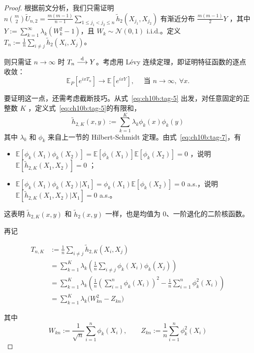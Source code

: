 \begin{proof}

根据前文分析，我们只需证明 $n\binom m2\widetilde U_{n,2}=\frac{m(m-1)}{n-1}\sum_{1\le j_1<j_2\le n}\widetilde h_2(X_{j_1},X_{j_2})$ 有渐近分布 $\tfrac{m(m-1)}{2}Y$ ，其中 $Y:=\sum_{k=1}^\infty\lambda_k(W_k^2-1)$，且 $W_k\sim \mathcal N(0,1)$ i.i.d.。定义 $T_n:=\frac1n\sum_{i\ne j}\widetilde h_2(X_i,X_j)$。

则只需证 $n\to\infty$ 时 $T_n\overset{\rm d}\longrightarrow Y$。考虑用 Lévy 连续定理，即证明特征函数的逐点收敛：
\[
\mathbb E_P[e^{ixT_n}]\to\mathbb E[e^{ixY}],\quad \text{ 当 }n\to\infty,\ \forall x.
\]

要证明这一点，还需考虑截断技巧。从式~\eqref{eq:ch10b:tag-5} 出发，对任意固定的正整数 $K$ ，定义式~\eqref{eq:ch10b:tag-5}的有限和，
\[\widetilde{h}_{2,K}(x,y) := \sum_{k=1}^{K} \lambda_k \phi_k(x) \phi_k(y)\]
其中 $\lambda_k$ 和 $\phi_k$ 来自上一节的 Hilbert-Schmidt 定理。由式~\eqref{eq:ch10b:tag-7}，有

\begin{itemize}
\tightlist
\item
  $\mathbb{E}[\phi_k(X_1)\phi_k(X_2)] = \mathbb{E}[\phi_k(X_1)]\mathbb{E}[\phi_k(X_2)] = 0$ ，说明 $\mathbb E[\widetilde h_{2,K}(X_1,X_2)]=0$ ；
\item
  $\mathbb{E}[\phi_k(X_1)\phi_k(X_2)|X_1] = \phi_k(X_1) \mathbb{E}[\phi_k(X_2)] = 0$ a.s.，说明 $\mathbb E[\widetilde h_{2,K}(X_1,X_2)|X_1]=0$ a.s.。
\end{itemize}

这表明 $\widetilde h_{2,K}(x,y)$ 和 $\widetilde h_2(x,y)$ 一样，也是均值为 0、一阶退化的二阶核函数。

再记

\begin{equation}
\label{eq:ch10b:tag-8}
\begin{aligned} T_{n,K} &:= \frac{1}{n} \sum_{i\neq j} \widetilde{h}_{2,K}(X_i,X_j) \\ &= \sum_{k=1}^{K} \lambda_k \left( \frac{1}{n} \sum_{i\neq j} \phi_k(X_i)\phi_k(X_j) \right)\\ &=\sum_{k=1}^{K} \lambda_k \left( \frac{1}{n} \left( \sum_{i=1}^{n} \phi_k(X_i) \right)^2 - \frac{1}{n} \sum_{i=1}^{n} \phi_k^2(X_i)\right)\\ &= \sum_{k=1}^{K} \lambda_k \bigl( W_{kn}^2 - Z_{kn} \bigr) \end{aligned}
\end{equation}

其中 
$$W_{kn} := \frac{1}{\sqrt{n}} \sum_{i=1}^{n} \phi_k(X_i), \qquad Z_{kn} := \frac{1}{n} \sum_{i=1}^{n} \phi_k^2(X_i)$$


\end{proof}
